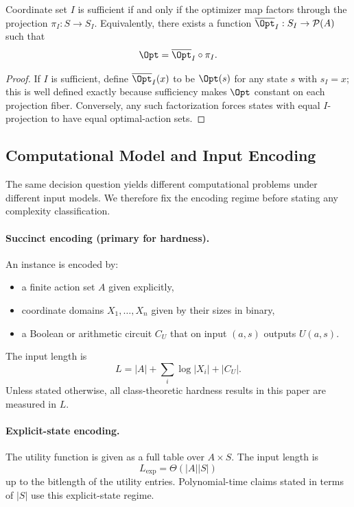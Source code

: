 
\begin{proposition}\label{prop:sufficiency-char}
Coordinate set $I$ is sufficient if and only if the optimizer map factors through the projection $\pi_I : S \to S_I$. Equivalently, there exists a function $\overline{\Opt}_I : S_I \to \mathcal{P}(A)$ such that
\[
\Opt = \overline{\Opt}_I \circ \pi_I.
\]
\end{proposition}


\begin{proof}
If $I$ is sufficient, define $\overline{\Opt}_I(x)$ to be $\Opt(s)$ for any state $s$ with $s_I = x$; this is well defined exactly because sufficiency makes $\Opt$ constant on each projection fiber. Conversely, any such factorization forces states with equal $I$-projection to have equal optimal-action sets.
\end{proof}

\subsection{Computational Model and Input Encoding}\label{sec:encoding}

The same decision question yields different computational problems under different input models. We therefore fix the encoding regime before stating any complexity classification.

\paragraph{Succinct encoding (primary for hardness).}
An instance is encoded by:
\begin{itemize}
\item a finite action set $A$ given explicitly,
\item coordinate domains $X_1,\ldots,X_n$ given by their sizes in binary,
\item a Boolean or arithmetic circuit $C_U$ that on input $(a,s)$ outputs $U(a,s)$.
\end{itemize}
The input length is
\[
L = |A| + \sum_i \log |X_i| + |C_U|.
\]
Unless stated otherwise, all class-theoretic hardness results in this paper are measured in $L$.

\paragraph{Explicit-state encoding.}
The utility function is given as a full table over $A \times S$. The input length is
\[
L_{\mathrm{exp}} = \Theta(|A||S|)
\]
up to the bitlength of the utility entries. Polynomial-time claims stated in terms of $|S|$ use this explicit-state regime.

